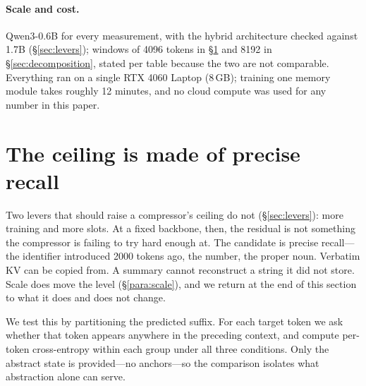 \documentclass[11pt]{article}
\begin{document}
\paragraph{Scale and cost.}
Qwen3-0.6B \citep{qwen3} for every measurement, with the hybrid architecture
checked against 1.7B (\S\ref{sec:levers}); windows of 4096 tokens in
\S\ref{sec:copyability} and 8192 in \S\ref{sec:decomposition}, stated per table
because the two are not comparable. Everything ran on a single RTX 4060 Laptop
(8\,GB); training one memory module takes roughly 12 minutes, and no cloud
compute was used for any number in this paper.

\section{The ceiling is made of precise recall}
\label{sec:copyability}

Two levers that should raise a compressor's ceiling do not
(\S\ref{sec:levers}): more training and more slots. At a fixed backbone, then,
the residual is not something the compressor is failing to try hard enough at.
The candidate is precise recall---the identifier introduced 2000 tokens ago, the
number, the proper noun. Verbatim KV can be copied from. A summary cannot
reconstruct a string it did not store. Scale does move the level
(\S\ref{para:scale}), and we return at the end of this section to what it does
and does not change.

We test this by partitioning the predicted suffix. For each target token we ask
whether that token appears anywhere in the preceding context, and compute
per-token cross-entropy within each group under all three conditions. Only the
abstract state is provided---no anchors---so the comparison isolates what
abstraction alone can serve.
\end{document}
